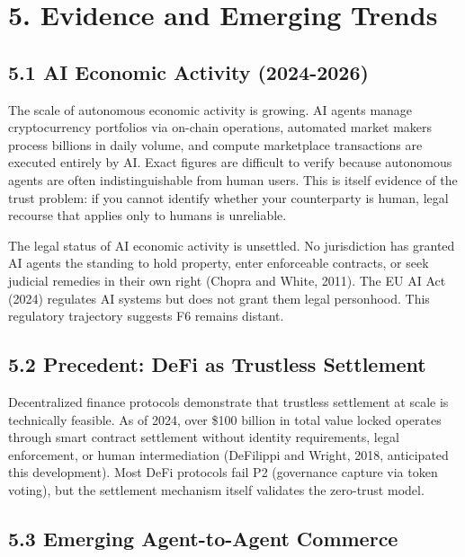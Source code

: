 \documentclass[12pt]{article}
\theoremstyle{definition}
\theoremstyle{remark}
\begin{document}
\section{5. Evidence and Emerging
Trends}\label{evidence-and-emerging-trends}

\subsection{5.1 AI Economic Activity
(2024-2026)}\label{ai-economic-activity-2024-2026}

The scale of autonomous economic activity is growing. AI agents manage
cryptocurrency portfolios via on-chain operations, automated market
makers process billions in daily volume, and compute marketplace
transactions are executed entirely by AI. Exact figures are difficult to
verify because autonomous agents are often indistinguishable from human
users. This is itself evidence of the trust problem: if you cannot
identify whether your counterparty is human, legal recourse that applies
only to humans is unreliable.

The legal status of AI economic activity is unsettled. No jurisdiction
has granted AI agents the standing to hold property, enter enforceable
contracts, or seek judicial remedies in their own right (Chopra and
White, 2011). The EU AI Act (2024) regulates AI systems but does not
grant them legal personhood. This regulatory trajectory suggests F6
remains distant.

\subsection{5.2 Precedent: DeFi as Trustless
Settlement}\label{precedent-defi-as-trustless-settlement}

Decentralized finance protocols demonstrate that trustless settlement at
scale is technically feasible. As of 2024, over \$100 billion in total
value locked operates through smart contract settlement without identity
requirements, legal enforcement, or human intermediation (DeFilippi and
Wright, 2018, anticipated this development). Most DeFi protocols fail P2
(governance capture via token voting), but the settlement mechanism
itself validates the zero-trust model.

\subsection{5.3 Emerging Agent-to-Agent
Commerce}\label{emerging-agent-to-agent-commerce}
\end{document}
